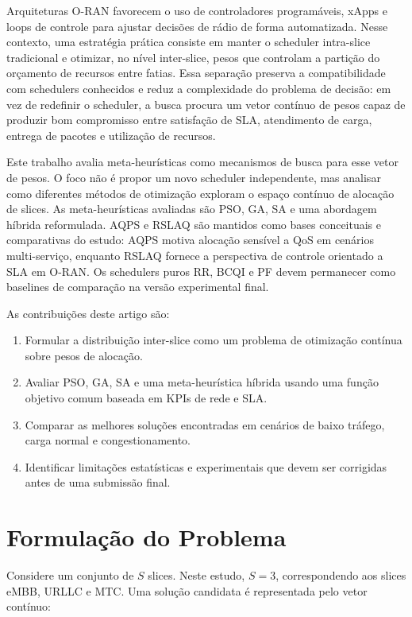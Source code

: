 \documentclass[12pt,a4paper]{article}
\begin{document}
Arquiteturas O-RAN favorecem o uso de controladores programáveis, xApps e loops de controle para ajustar decisões de rádio de forma automatizada. Nesse contexto, uma estratégia prática consiste em manter o scheduler intra-slice tradicional e otimizar, no nível inter-slice, pesos que controlam a partição do orçamento de recursos entre fatias. Essa separação preserva a compatibilidade com schedulers conhecidos e reduz a complexidade do problema de decisão: em vez de redefinir o scheduler, a busca procura um vetor contínuo de pesos capaz de produzir bom compromisso entre satisfação de SLA, atendimento de carga, entrega de pacotes e utilização de recursos.

Este trabalho avalia meta-heurísticas como mecanismos de busca para esse vetor de pesos. O foco não é propor um novo scheduler independente, mas analisar como diferentes métodos de otimização exploram o espaço contínuo de alocação de slices. As meta-heurísticas avaliadas são PSO, GA, SA e uma abordagem híbrida reformulada. AQPS e RSLAQ são mantidos como bases conceituais e comparativas do estudo: AQPS motiva alocação sensível a QoS em cenários multi-serviço, enquanto RSLAQ fornece a perspectiva de controle orientado a SLA em O-RAN. Os schedulers puros RR, BCQI e PF devem permanecer como baselines de comparação na versão experimental final.

As contribuições deste artigo são:

\begin{enumerate}
  \item Formular a distribuição inter-slice como um problema de otimização contínua sobre pesos de alocação.
  \item Avaliar PSO, GA, SA e uma meta-heurística híbrida usando uma função objetivo comum baseada em KPIs de rede e SLA.
  \item Comparar as melhores soluções encontradas em cenários de baixo tráfego, carga normal e congestionamento.
  \item Identificar limitações estatísticas e experimentais que devem ser corrigidas antes de uma submissão final.
\end{enumerate}

\section{Formulação do Problema}

Considere um conjunto de \(S\) slices. Neste estudo, \(S=3\), correspondendo aos slices eMBB, URLLC e MTC. Uma solução candidata é representada pelo vetor contínuo:
\end{document}
